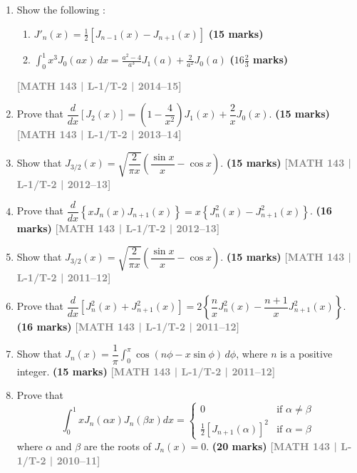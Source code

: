 \documentclass[12pt,a4paper]{article}
\newcommand{\yr}[1]{\hfill\textcolor{gray}{\small\textbf{[#1]}}}
\newcommand{\mk}[1]{\textcolor{orange!70!black}{\small\textbf{(#1 marks)}}}
\begin{document}
\begin{enumerate}
\item Show the following :
\begin{enumerate}
   \item $\displaystyle J'_n(x) = \frac{1}{2}[J_{n-1}(x) - J_{n+1}(x)]$ \hfill \mk{15}
    \item $\displaystyle \int_0^1 x^3 J_0(ax) \,dx = \frac{a^2 - 4}{a^3} J_1(a) + \frac{2}{a^2} J_0(a)$ \hfill \mk{$16\frac{2}{3}$} 
\end{enumerate}

\yr{MATH 143 | L-1/T-2 | 2014--15}
    
\item Prove that $\dfrac{d}{dx}\left[J_{2}(x)\right]=\left(1-\dfrac{4}{x^{2}}\right)J_{1}(x)+\dfrac{2}{x}J_{0}(x)$.
\mk{15} \yr{MATH 143 | L-1/T-2 | 2013--14}

\item Show that $J_{3/2}(x)=\sqrt{\dfrac{2}{\pi x}}\left(\dfrac{\sin x}{x}-\cos x\right)$.
\mk{15} \yr{MATH 143 | L-1/T-2 | 2012--13}

\item Prove that $\dfrac{d}{dx}\left\{xJ_{n}(x)J_{n+1}(x)\right\}=x\left\{J_{n}^{2}(x)-J_{n+1}^{2}(x)\right\}$.
\mk{16\textonehalf} \yr{MATH 143 | L-1/T-2 | 2012--13}

\item Show that $J_{3/2}(x)=\sqrt{\dfrac{2}{\pi x}}\left(\dfrac{\sin x}{x}-\cos x\right)$.
\mk{15} \yr{MATH 143 | L-1/T-2 | 2011--12}

\item Prove that $\dfrac{d}{dx}\left[J_{n}^{2}(x)+J_{n+1}^{2}(x)\right]=2\left\{\dfrac{n}{x}J_{n}^{2}(x)-\dfrac{n+1}{x}J_{n+1}^{2}(x)\right\}$.
\mk{16\textonehalf} \yr{MATH 143 | L-1/T-2 | 2011--12}

\item Show that $J_{n}(x)=\dfrac{1}{\pi}\displaystyle\int_{0}^{\pi}\cos(n\phi-x\sin\phi)\,d\phi$, where $n$ is a positive integer.
\mk{15} \yr{MATH 143 | L-1/T-2 | 2011--12}

\item Prove that 
$$\int_{0}^{1} x J_{n}(\alpha x) J_{n}(\beta x) dx = \begin{cases} 0 & \text{if } \alpha \neq \beta \\ \frac{1}{2} [J_{n+1}(\alpha)]^2 & \text{if } \alpha = \beta \end{cases}$$
where $\alpha$ and $\beta$ are the roots of $J_{n}(x) = 0$.
\mk{20} \yr{MATH 143 | L-1/T-2 | 2010--11}

\end{enumerate}
\end{document}
